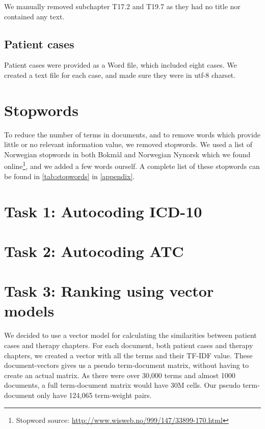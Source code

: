 We manually removed subchapter T17.2 and T19.7 as they had no title nor
contained any text.

\subsection{Patient cases}
Patient cases were provided as a Word file, which included eight cases. We
created a text file for each case, and made sure they were in utf-8 charset.


\section{Stopwords}
To reduce the number of terms in documents, and to remove words which provide
little or no relevant information value, we removed stopwords.
We used a list of Norwegian stopwords in both Bokmål and Norwegian Nynorsk
which we found
online\footnote{Stopword source: \url{http://www.wisweb.no/999/147/33899-170.html}},
and we added a few words ourself. A complete list of these stopwords can
be found in \autoref{tab:stopwords} in \autoref{appendix}.


\section{Task 1: Autocoding ICD-10}




\section{Task 2: Autocoding ATC}


\section{Task 3: Ranking using vector models}
\label{sec:task3}
We decided to use a vector model for calculating the similarities between
patient cases and therapy chapters. For each document, both patient cases
and therapy chapters, we created a vector with all the terms and their
TF-IDF value. These document-vectors gives us a pseudo term-document matrix,
without having to create an actual matrix. As there were over 30,000 terms
and almost 1000 documents, a full term-document matrix would have 30M cells.
Our pseudo term-document only have 124,065 term-weight pairs.


